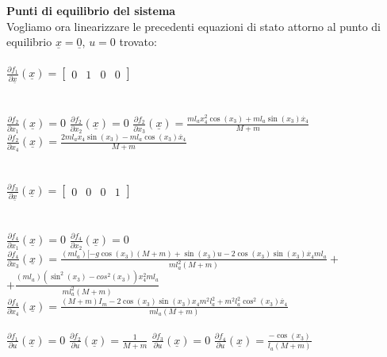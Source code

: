 \textbf{Punti di equilibrio del sistema} \\
Vogliamo ora linearizzare le precedenti equazioni di stato attorno al punto di equilibrio $\underline{x}=\underline{0}$, $u=0$ trovato: \\\\
$\displaystyle\frac{\partial{f_1}}{\partial{\underline{x}}}(\underline x)=
\begin{bmatrix}
0&1&0&0
\end{bmatrix}$\\\\\\
$\displaystyle\frac{\partial{f_2}}{\partial{x_1}}(\underline{x})=0$\quad
$\displaystyle\frac{\partial{f_2}}{\partial{x_2}}(\underline{x})=0$\quad
$\displaystyle\frac{\partial{f_2}}{\partial{x_3}}(\underline{x})=\displaystyle\frac{ml_ax_4^2\cos(x_3)+ml_a\sin(x_3)\dot{x_4}}{M+m}$\\
$\displaystyle\frac{\partial{f_2}}{\partial{x_4}}(\underline{x})=\displaystyle\frac{2ml_ax_4\sin(x_3)-ml_a\cos(x_3)\ddot{x_4}}{M+m}$\\\\\\
$\displaystyle\frac{\partial{f_3}}{\partial{\underline{x}}}(\underline x)=
\begin{bmatrix}
0&0&0&1
\end{bmatrix}$\\\\\\
$\displaystyle\frac{\partial{f_4}}{\partial{x_1}}(\underline{x})=0$\quad
$\displaystyle\frac{\partial{f_4}}{\partial{x_2}}(\underline{x})=0$\\
$\displaystyle\frac{\partial{f_4}}{\partial{x_3}}(\underline{x})=\displaystyle\frac{(ml_a)[-g\cos(x_3)(M+m)+\sin(x_3)u-2\cos(x_3)\sin(x_3)\dot{x_4}ml_a}{ml_a^2(M+m)}+$
$+\displaystyle\frac{(ml_a)(\sin^2(x_3)-cos^2(x_3))x^2_4ml_a}{ml_a^2(M+m)}$\\
$\displaystyle\frac{\partial{f_4}}{\partial{x_4}}(\underline{x})=\displaystyle\frac{(M+m)I_m-2\cos(x_3)\sin(x_3)x_4m^2l_a^2+m^2l_a^2\cos^2(x_3)\ddot{x_4}}{ml_a(M+m)}$\\\\
$\displaystyle\frac{\partial{f_1}}{\partial{u}}(\underline{x})=0$\quad
$\displaystyle\frac{\partial{f_2}}{\partial{u}}(\underline{x})=\displaystyle\frac{1}{M+m}$\quad
$\displaystyle\frac{\partial{f_3}}{\partial{u}}(\underline{x})=0$\quad
$\displaystyle\frac{\partial{f_4}}{\partial{u}}(\underline{x})=\displaystyle\frac{-\cos(x_3)}{l_a(M+m)}$\\\\
